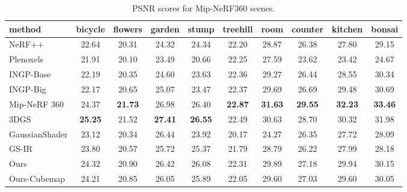 \documentclass{article} %
\begin{document}
\begin{table}[b]
    \small
    \centering
    \renewcommand{\arraystretch}{1}
    \caption{PSNR scores for Mip-NeRF360 scenes.}
    \label{tab:mip1}
    \begin{tabular}{l|ccccc|cccc}
         \hline
         method & bicycle & flowers & garden & stump & treehill & room & counter & kitchen & bonsai\\
        \hline NeRF++ & 22.64 & 20.31 &  24.32  & 24.34 &  22.20 &  28.87 &26.38 &27.80 &29.15 \\
         Plenoxels & 21.91 & 20.10 &  23.49  & 20.66 &  22.25 &  27.59 &23.62 &23.42 &24.67 \\
         INGP-Base & 22.19 & 20.35 &  24.60 & 23.63 &  22.36 &  29.27 &26.44 &28.55 &30.34 \\
         INGP-Big & 22.17 & 20.65 &  25.07 & 23.47 &  \cellcolor{c}22.37 &  29.69 &26.69 &29.48 &\cellcolor{c}30.69 \\
         Mip-NeRF 360 & \cellcolor{b}24.37 & \cellcolor{a}\textbf{21.73} &  \cellcolor{b}26.98 & \cellcolor{b}26.40 &  \cellcolor{a}\textbf{22.87} &  \cellcolor{a}\textbf{31.63} &\cellcolor{a}\textbf{29.55} &\cellcolor{a}\textbf{32.23} &\cellcolor{a}\textbf{33.46} \\
         3DGS & \cellcolor{a}\textbf{25.25} & \cellcolor{b}21.52 &  \cellcolor{a}\textbf{27.41} & \cellcolor{a}\textbf{26.55} &   \cellcolor{b}22.49 &  \cellcolor{b}30.63 &\cellcolor{b}28.70 & \cellcolor{b}30.32 & \cellcolor{b}31.98\\
        \hline GaussianShader & 23.12 & 20.34 & \cellcolor{c}26.44 &  23.92 &   20.17 &  24.27 & 26.35 & 27.72 & 28.09\\
         GS-IR & 23.80 & 20.57 & 25.72 &   25.37 &  21.79 &  28.79 &  26.22 & 27.99 & 28.18\\
         \hline
         Ours  & \cellcolor{c}24.32 & \cellcolor{c}20.90 & 26.42 & \cellcolor{c}26.08 &  22.31 &  \cellcolor{c}29.89 & \cellcolor{c} 27.18 & \cellcolor{c}29.94 & 30.15\\
         Ours-Cubemap &24.21 & 20.85 & 26.05 &   25.89 &  22.05 &  29.60 &  27.03 & 29.60 & 30.05\\
        \hline 
    \end{tabular}
\end{table}
\end{document}
